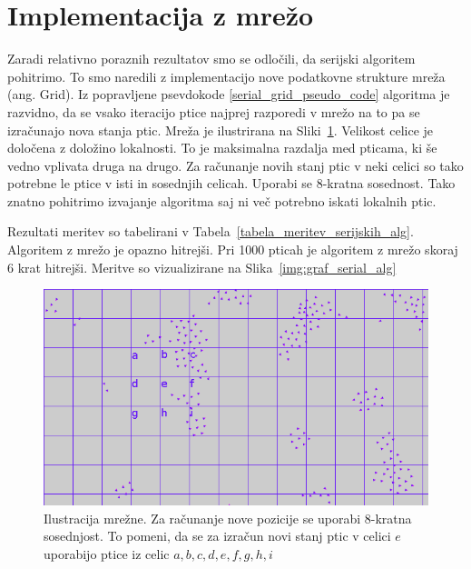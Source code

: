 \documentclass[a4paper, 12pt]{book}
\begin{document}
\section{Implementacija z mrežo}
Zaradi relativno poraznih rezultatov smo se odločili, da serijski algoritem pohitrimo. To smo naredili z implementacijo nove podatkovne strukture mreža (ang. Grid). Iz popravljene psevdokode \ref{serial_grid_pseudo_code} algoritma je razvidno, da se vsako iteracijo ptice najprej razporedi v mrežo na to pa se izračunajo nova stanja ptic. Mreža je ilustrirana na Sliki~\ref{img:flocking_simulation_grid}. Velikost celice je določena z doložino lokalnosti. To je maksimalna razdalja med pticama, ki še vedno vplivata druga na drugo. Za računanje novih stanj ptic v neki celici so tako potrebne le ptice v isti in sosednjih celicah. Uporabi se 8-kratna sosednost. Tako znatno pohitrimo izvajanje algoritma saj ni več potrebno iskati lokalnih ptic.

Rezultati meritev so tabelirani v Tabela~\ref{tabela_meritev_serijskih_alg}. Algoritem z mrežo je opazno hitrejši. Pri 1000 pticah je algoritem z mrežo skoraj 6 krat hitrejši. Meritve so vizualizirane na Slika~\ref{img:graf_serial_alg}

\begin{figure}[t]
\includegraphics[width=\textwidth]{flocking_simulation_grid}
\caption{Ilustracija mrežne. Za računanje nove pozicije se uporabi 8-kratna sosednjost. To pomeni, da se za izračun novi stanj ptic v celici $e$ uporabijo ptice iz celic $a, b, c, d, e, f, g, h, i$}
\label{img:flocking_simulation_grid}
\centering
\end{figure}
\end{document}
